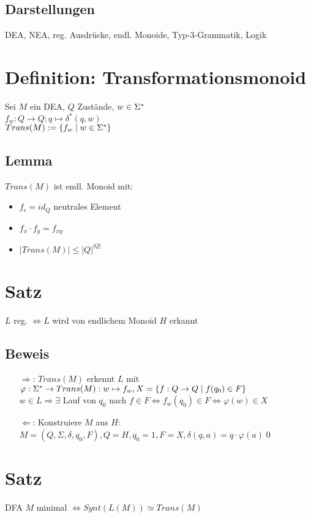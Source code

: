     \subsection{Darstellungen}
        DEA, NEA, reg. Ausdrücke, endl. Monoide, Typ-3-Grammatik, Logik
\section{Definition: Transformationsmonoid}
        Sei $M$ ein DEA, $Q$ Zustände, $w\in\Sigma^*$\\
        $f_w:Q\rightarrow Q: q\mapsto \delta^*(q,w)$\\
        $Trans(M):=\{f_w\mid w\in\Sigma^*\}$
    \subsection{Lemma}
        $Trans(M)$ ist endl. Monoid mit:
        \begin{itemize}
            \item $f_\epsilon=id_Q$ neutrales Element
            \item $f_x\cdot f_y=f_{xy}$
            \item $|Trans(M)|\leq |Q|^{|Q|}$
        \end{itemize}
\section{Satz}
    $L$ reg. $\Leftrightarrow L$ wird von endlichem Monoid $H$ erkannt
    \subsection{Beweis}
        \begin{itemize}
            \item[$\Rightarrow$:] $Trans(M)$ erkennt $L$ mit $\varphi:\Sigma^*\rightarrow Trans(M):w\mapsto f_w,\\ X=\{f:Q\rightarrow Q\mid f(q_0)\in F\}$\\
            $w\in L\Rightarrow\exists$ Lauf von $q_0$ nach $f\in F\Leftrightarrow f_w(q_0)\in F\Leftrightarrow\varphi(w)\in X$
            \item[$\Leftarrow$:] Konstruiere $M$ aus $H$:\\
            $M=(Q,\Sigma,\delta,q_0,F),Q=H,q_0=1,F=X,\delta(q,a)=q\cdot\varphi(a)$\qed
        \end{itemize}
\section{Satz}
    DFA $M$ minimal $\Leftrightarrow Synt(L(M))\simeq Trans(M)$
